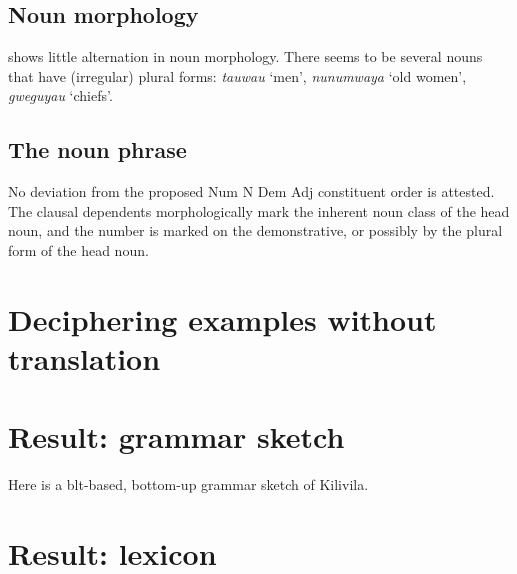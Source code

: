 \documentclass{article}
\newcommand*{\corpus}[1]{\emph{#1}}
\newcommand{\translate}[1]{`#1'}
\begin{document}
\subsection{Noun morphology}

 shows little alternation in noun morphology.
There seems to be several nouns that have (irregular) plural forms:
\corpus{tauwau} \translate{men}, 
\corpus{nunumwaya} \translate{old women},
\corpus{gweguyau} \translate{chiefs}.

\subsection{The noun phrase}

No deviation from the proposed Num N Dem Adj constituent order is attested.
The clausal dependents morphologically mark the inherent noun class of the head noun,
and the number is marked on the demonstrative, or possibly by the plural form of the head noun.

\section{Deciphering examples without translation}



\section{Result: grammar sketch}

Here is a \ac{blt}-based, bottom-up grammar sketch of Kilivila.

\section{Result: lexicon}
\end{document}
